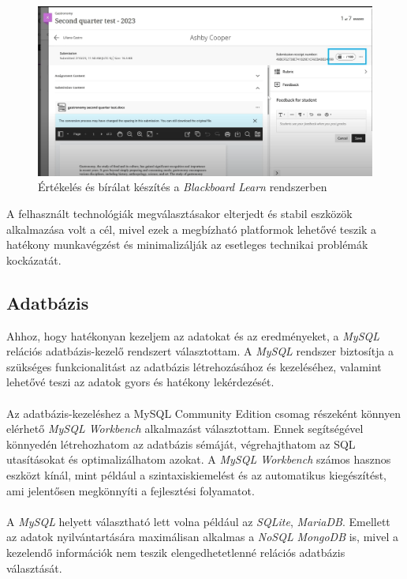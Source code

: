 \begin{figure}[h]
\centering
\includegraphics[scale=0.4]{images/Blackboard_Learn.png}
\caption{Értékelés és bírálat készítés a \textit{Blackboard Learn} rendszerben \cite{blackboard_learn_review}}
\label{fig:blackboard_learn_review}
\end{figure}


A felhasznált technológiák megválasztásakor elterjedt és stabil eszközök alkalmazása volt a cél, mivel ezek a megbízható platformok lehetővé teszik a hatékony munkavégzést és minimalizálják az esetleges technikai problémák kockázatát.


\subsection{Adatbázis}

Ahhoz, hogy hatékonyan kezeljem az adatokat és az eredményeket, a \textit{MySQL} \cite{MySQL} relációs adatbázis-kezelő rendszert választottam. A \textit{MySQL} rendszer biztosítja a szükséges funkcionalitást az adatbázis létrehozásához és kezeléséhez, valamint lehetővé teszi az adatok gyors és hatékony lekérdezését.\\
\\
Az adatbázis-kezeléshez a MySQL Community Edition csomag részeként könnyen elérhető \textit{MySQL Workbench} \cite{MySQL_Workbench} alkalmazást választottam. Ennek segítségével könnyedén létrehozhatom az adatbázis sémáját, végrehajthatom az SQL utasításokat és optimalizálhatom azokat. A \textit{MySQL Workbench} számos hasznos eszközt kínál, mint például a szintaxiskiemelést és az automatikus kiegészítést, ami jelentősen megkönnyíti a fejlesztési folyamatot.\\
\\
A \textit{MySQL} helyett választható lett volna például az \textit{SQLite}, \textit{MariaDB}. Emellett az adatok nyilvántartására maximálisan alkalmas a \textit{NoSQL} \textit{MongoDB} is, mivel a kezelendő információk nem teszik elengedhetetlenné relációs adatbázis választását.


